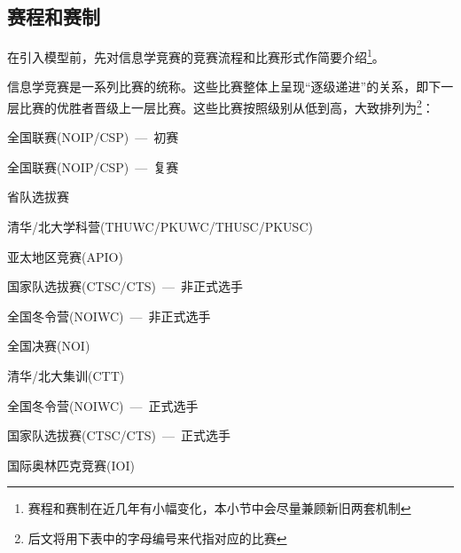     \subsection{赛程和赛制}

        在引入模型前，先对信息学竞赛的竞赛流程和比赛形式作简要介绍\footnote{赛程和赛制在近几年有小幅变化，本小节中会尽量兼顾新旧两套机制}。

        信息学竞赛是一系列比赛的统称。这些比赛整体上呈现“逐级递进”的关系，即下一层比赛的优胜者晋级上一层比赛。这些比赛按照级别从低到高，大致排列为\footnote{后文将用下表中的字母编号来代指对应的比赛}：

        \begin{samepage}
            \begin{asparaenum}[a.]
                \item 全国联赛(NOIP/CSP)\ ---\ 初赛 
                \nopagebreak
                \item 全国联赛(NOIP/CSP)\ ---\ 复赛
                \nopagebreak
                \item 省队选拔赛
                \nopagebreak
                \item 清华/北大学科营(THUWC/PKUWC/THUSC/PKUSC)
                \nopagebreak
                \item 亚太地区竞赛(APIO)
                \nopagebreak
                \item 国家队选拔赛(CTSC/CTS)\ ---\ 非正式选手
                \nopagebreak
                \item 全国冬令营(NOIWC)\ ---\ 非正式选手
                \nopagebreak
                \item 全国决赛(NOI)
                \nopagebreak
                \item 清华/北大集训(CTT)
                \nopagebreak
                \item 全国冬令营(NOIWC)\ ---\ 正式选手
                \nopagebreak
                \item 国家队选拔赛(CTSC/CTS)\ ---\ 正式选手
                \nopagebreak
                \item 国际奥林匹克竞赛(IOI)
            \end{asparaenum}
        \end{samepage}

